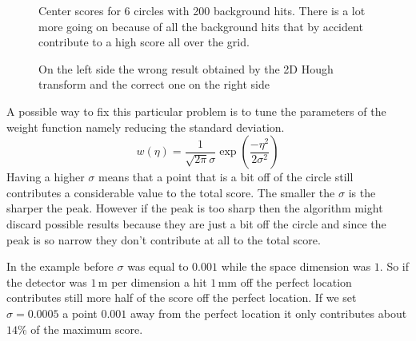 \documentclass[11pt]{scrreprt}
\begin{document}
\begin{figure}
\centering

  \caption[Center scores for 6 circles with 200 background hits.]{Center scores for 6 circles with 200 background hits. There is a lot more going on because of all the background hits that by accident contribute to a high score all over the grid.}

\caption{On the left side the wrong result obtained by the 2D Hough transform and the correct one on the right side}
\end{figure}

A possible way to fix this particular problem is to tune the parameters of the weight function namely reducing the standard deviation. 
\[
  w(\eta) = \frac{1}{\sqrt{2\pi}\sigma}\exp\left( \frac{-\eta^2}{2\sigma^2}\right)
\]
Having a higher $\sigma$ means that a point that is a bit off of the circle still contributes a considerable value to the total score. 
The smaller the $\sigma$ is the sharper the peak. However if the peak is too sharp then the algorithm might discard possible results 
because they are just a bit off the circle and since the peak is so narrow they don't contribute at all to the total score.

In the example before $\sigma$ was equal to $0.001$ while the space dimension was $1$. So if the detector was $1$\,m per dimension a hit $1$\,mm off the perfect location contributes still more half of the score off the perfect location. If we set $\sigma=0.0005$ a point $0.001$ away from the perfect location it only contributes about $14\%$ of the maximum score.
\end{document}
